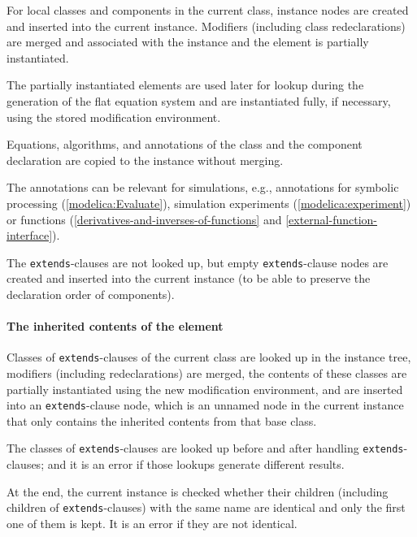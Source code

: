 For local classes and components in the current class, instance nodes are created and inserted into the current instance.
Modifiers (including class redeclarations) are merged and associated with the instance and the element is partially instantiated.

\begin{nonnormative}
The partially instantiated elements are used later for lookup during the generation of the flat equation system and are instantiated fully, if necessary, using the stored modification environment.
\end{nonnormative}

Equations, algorithms, and annotations of the class and the component declaration are copied to the instance without merging.

\begin{nonnormative}
The annotations can be relevant for simulations, e.g., annotations for symbolic processing (\cref{modelica:Evaluate}), simulation experiments (\cref{modelica:experiment}) or functions (\cref{derivatives-and-inverses-of-functions} and \cref{external-function-interface}).
\end{nonnormative}

The \lstinline!extends!-clauses are not looked up, but empty \lstinline!extends!-clause nodes are created and inserted into the current instance (to be able to preserve the declaration order of components).

\paragraph*{The inherited contents of the element}\label{the-inherited-contents-of-the-element}

Classes of \lstinline!extends!-clauses of the current class are looked up in the instance tree, modifiers (including redeclarations) are merged, the contents of these classes are partially instantiated using the new modification environment, and are inserted into an \lstinline!extends!-clause node, which is an unnamed node in the current instance that only contains the inherited contents from that base class.

The classes of \lstinline!extends!-clauses are looked up before and after handling \lstinline!extends!-clauses; and it is an error if those lookups generate different results.

At the end, the current instance is checked whether their children (including children of \lstinline!extends!-clauses) with the same name are identical and only the first one of them is kept.
It is an error if they are not identical.

